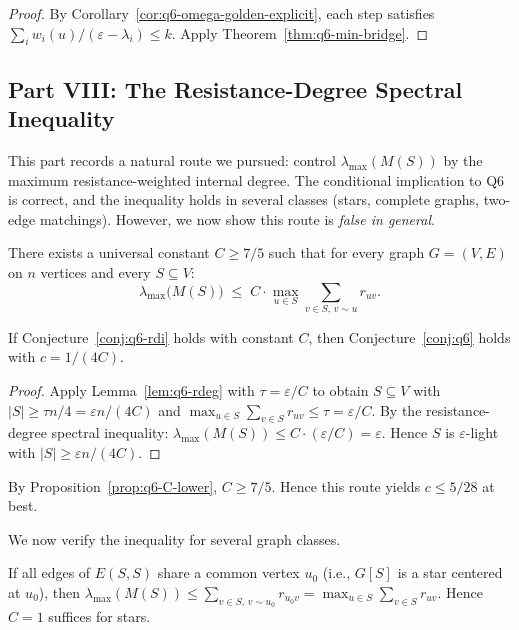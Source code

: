 \begin{proof}
By Corollary~\ref{cor:q6-omega-golden-explicit}, each step satisfies
\(\sum_i w_i(u)/(\varepsilon-\lambda_i)\le k\).
Apply Theorem~\ref{thm:q6-min-bridge}.
\end{proof}

\subsection*{Part VIII: The Resistance-Degree Spectral Inequality}

This part records a natural route we pursued:
control $\lambda_{\max}(M(S))$ by the maximum resistance-weighted
internal degree. The conditional implication to Q6 is correct, and the
inequality holds in several classes (stars, complete graphs, two-edge
matchings). However, we now show this route is \emph{false in general}.

\begin{conjecture}\label{conj:q6-rdi}
There exists a universal constant $C\ge 7/5$ such that for every
graph $G=(V,E)$ on $n$ vertices and every $S\subseteq V$:
\[
\lambda_{\max}\!\bigl(M(S)\bigr)
\;\le\; C\cdot
\max_{u\in S}\sum_{v\in S,\,v\sim u} r_{uv}.
\]
\end{conjecture}

\begin{theorem}\label{thm:q6-rdi-implies}
If Conjecture~\ref{conj:q6-rdi} holds with constant $C$, then
Conjecture~\ref{conj:q6} holds with $c=1/(4C)$.
\end{theorem}

\begin{proof}
Apply Lemma~\ref{lem:q6-rdeg} with $\tau=\varepsilon/C$
to obtain $S\subseteq V$ with
$|S|\ge\tau n/4=\varepsilon n/(4C)$ and
$\max_{u\in S}\sum_{v\in S}r_{uv}\le\tau=\varepsilon/C$.
By the resistance-degree spectral inequality:
$\lambda_{\max}(M(S))\le C\cdot(\varepsilon/C)=\varepsilon$.
Hence $S$ is $\varepsilon$-light with $|S|\ge\varepsilon n/(4C)$.
\end{proof}

\begin{remark}
By Proposition~\ref{prop:q6-C-lower}, $C\ge 7/5$.
Hence this route yields $c\le 5/28$ at best.
\end{remark}

We now verify the inequality for several graph classes.

\begin{proposition}\label{prop:q6-rdi-star}
If all edges of $E(S,S)$ share a common vertex $u_0$
(i.e., $G[S]$ is a star centered at $u_0$), then
$\lambda_{\max}(M(S))\le\sum_{v\in S,\,v\sim u_0}r_{u_0 v}
= \max_{u\in S}\sum_{v\in S}r_{uv}$.
Hence $C=1$ suffices for stars.
\end{proposition}

